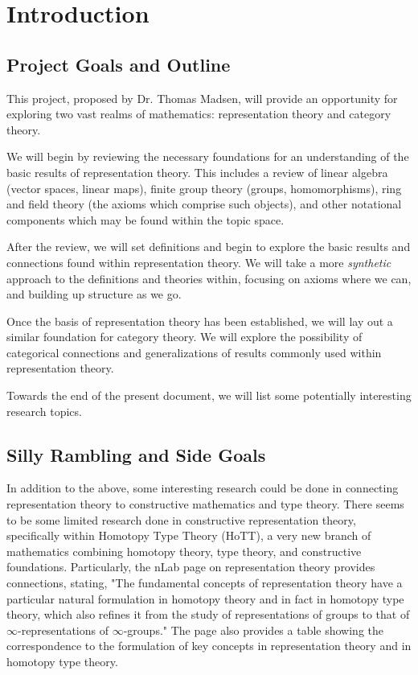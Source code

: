 \section{Introduction}
\subsection{Project Goals and Outline}

This project, proposed by Dr. Thomas Madsen, will provide an opportunity for
exploring two vast realms of mathematics: representation theory and category
theory.

We will begin by reviewing the necessary foundations for an understanding of
the basic results of representation theory. This includes a review of linear
algebra (vector spaces, linear maps), finite group theory (groups,
homomorphisms), ring and field theory (the axioms which comprise such objects),
and other notational components which may be found within the topic space.

After the review, we will set definitions and begin to explore the basic
results and connections found within representation theory. We will take a more
\textit{synthetic} approach to the definitions and theories within, focusing on
axioms where we can, and building up structure as we go.

Once the basis of representation theory has been established, we will lay out
a similar foundation for category theory. We will explore the possibility of
categorical connections and generalizations of results commonly used within
representation theory.

Towards the end of the present document, we will list some potentially
interesting research topics.

\subsection{Silly Rambling and Side Goals}

In addition to the above, some interesting research could be done in connecting
representation theory to constructive mathematics and type theory. There
seems to be some limited research done in constructive representation theory,
specifically within Homotopy Type Theory (HoTT), a very new branch of
mathematics combining homotopy theory, type theory, and constructive
foundations. Particularly, the nLab page on representation theory
\cite{nlabRT} provides connections, stating, "The fundamental concepts of
representation theory have a particular natural formulation in homotopy theory
and in fact in homotopy type theory, which also refines it from the study of
representations of groups to that of $\infty$-representations of
$\infty$-groups." The page also provides a table showing the correspondence to
the formulation of key concepts in representation theory and in homotopy type
theory.
